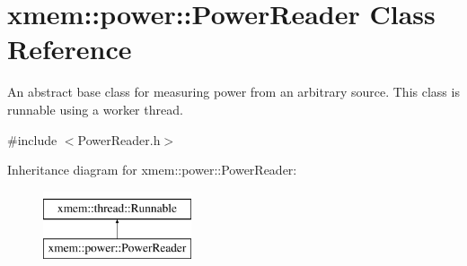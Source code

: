 \hypertarget{classxmem_1_1power_1_1_power_reader}{\section{xmem\-:\-:power\-:\-:Power\-Reader Class Reference}
\label{classxmem_1_1power_1_1_power_reader}
}


An abstract base class for measuring power from an arbitrary source. This class is runnable using a worker thread.  




{\ttfamily \#include $<$Power\-Reader.\-h$>$}

Inheritance diagram for xmem\-:\-:power\-:\-:Power\-Reader\-:\begin{figure}[H]
\begin{center}
\leavevmode
\includegraphics[height=2.000000cm]{classxmem_1_1power_1_1_power_reader}
\end{center}
\end{figure}
